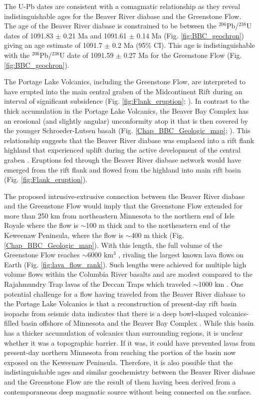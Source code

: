 The U-Pb dates are consistent with a comagmatic relationship as they reveal indistinguishable ages for the Beaver River diabase and the Greenstone Flow. The age of the Beaver River diabase is constrained to be between the $^{206}$Pb/$^{238}$U dates of  1091.83 $\pm$ 0.21 Ma and 1091.61 $\pm$ 0.14 Ma (Fig. \ref{fig:BBC_geochron}) giving an age estimate of 1091.7 $\pm$ 0.2 Ma (95\% CI). This age is indistinguishable with the $^{206}$Pb/$^{238}$U date of 1091.59 $\pm$ 0.27 Ma for the Greenstone Flow (Fig. \ref{fig:BBC_geochron}).

The Portage Lake Volcanics, including the Greenstone Flow, are interpreted to have erupted into the main central graben of the Midcontinent Rift during an interval of significant subsidence (Fig. \ref{fig:Flank_eruption}; \citealp{Miller1997a,Cannon1992b}). In contrast to the thick accumulation in the Portage Lake Volcanics, the Beaver Bay Complex has an erosional (and slightly angular) unconformity atop it that is then covered by the younger Schroeder-Lutsen basalt (Fig. \ref{Chap_BBC_Geologic_map}; \cite{Miller2001a}). This relationship suggests that the Beaver River diabase was emplaced into a rift flank highland that experienced uplift during the active development of the central graben \citep{Swanson-Hysell2019a}. Eruptions fed through the Beaver River diabase network would have emerged from the rift flank and flowed from the highland into main rift basin (Fig. \ref{fig:Flank_eruption}). 

The proposed intrusive-extrusive connection between the Beaver River diabase and the Greenstone Flow would imply that the Greenstone Flow extended for more than 250 km from northeastern Minnesota to the northern end of Isle Royale where the flow is $\sim$100 m thick and to the northeastern end of the Keweenaw Peninsula, where the flow is $\sim$400 m thick (Fig. \ref{Chap_BBC_Geologic_map}). With this length, the full volume of the Greenstone Flow reaches $\sim$6000 km$^3$ \citep{Doyle2016a}, rivaling the largest known lava flows on Earth (Fig. \ref{fig:lava_flow_rank}). Such lengths were achieved for multiple high volume flows within the Columbia River basalts \citep{Reidel2013a} and are modest compared to the Rajahmundry Trap lavas of the Deccan Traps which traveled $\sim$1000 km \citep{Self2008a}. One potential challenge for a flow having traveled from the Beaver River diabase to the Portage Lake Volcanics is that a reconstruction of present-day rift basin isopachs from seismic data indicates that there is a deep bowl-shaped volcanics-filled basin offshore of Minnesota and the Beaver Bay Complex \citep{Stewart2018a}. While this basin has a thicker accumulation of volcanics than surrounding regions, it is unclear whether it was a topographic barrier. If it was, it could have prevented lavas from present-day northern Minnesota from reaching the portion of the basin now exposed on the Keweenaw Peninsula. Therefore, it is also possible that the indistinguishable ages and similar geochemistry between the Beaver River diabase and the Greenstone Flow are the result of them having been derived from a contemporaneous deep magmatic source without being connected on the surface. 

